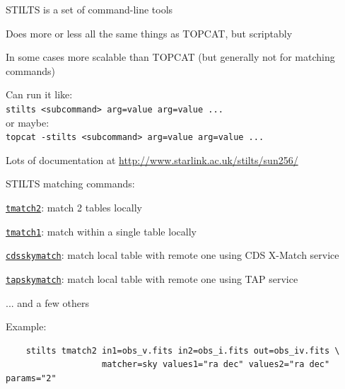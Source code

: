 \documentclass[20pt,landscape]{foils}
\newcommand{\bhref}[2]{\href{#1}{{\color{blue}#2}}}
\newcommand{\burl}[1]{{\color{blue}\url{#1}}}
\begin{document}
\vspace*{-0.2cm}
\begin{list0}
  \item STILTS is a set of command-line tools
  \begin{list2big}
    \item Does more or less all the same things as TOPCAT, but scriptably
    \item In some cases more scalable than TOPCAT
          (but generally not for matching commands)
    \item Can run it like:\\
          \hspace*{3em}
          {\color{brown}\verb|stilts <subcommand> arg=value arg=value ...|} \\
          or maybe: \\
          \hspace*{3em}
          {\color{brown}\verb|topcat -stilts <subcommand> arg=value arg=value ...|}
    \item Lots of documentation at
          \burl{http://www.starlink.ac.uk/stilts/sun256/}
  \end{list2big}
  \item STILTS matching commands:
  \begin{list2}
    \item[] \bhref{http://www.starlink.ac.uk/stilts/sun256/tmatch2.html}
                  {\tt tmatch2}: match 2 tables locally
    \item[] \bhref{http://www.starlink.ac.uk/stilts/sun256/tmatch1.html}
                  {\tt tmatch1}: match within a single table locally
    \item[] \bhref{http://www.starlink.ac.uk/stilts/sun256/cdsskymatch.html}
                  {\tt cdsskymatch}: match local table with remote one
                                     using CDS X-Match service
    \item[] \bhref{http://www.starlink.ac.uk/stilts/sun256/tapskymatch.html}
                  {\tt tapskymatch}: match local table with remote one
                                     using TAP service
    \item[] \hspace*{2em} ... and a few others
  \end{list2}
\vspace*{-0.2cm}
  \item Example: \\
\vspace*{-0.2cm}
        {\color{brown}\small
        \begin{verbatim}
    stilts tmatch2 in1=obs_v.fits in2=obs_i.fits out=obs_iv.fits \
                   matcher=sky values1="ra dec" values2="ra dec" params="2"
        \end{verbatim}}
\end{list0}
\end{document}
